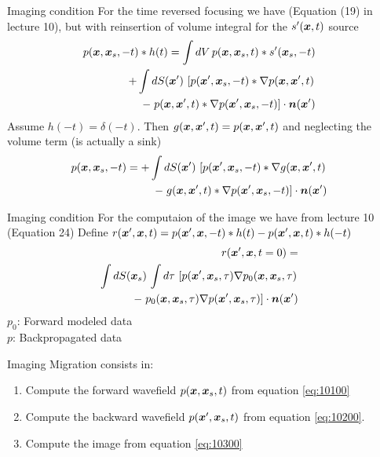 \documentclass[xcolor=dvipsnames,notes]{beamer}
\begin{document}
\begin{frame}{Imaging condition}
For the time reversed focusing we have
(Equation (19) in lecture 10), but with reinsertion of volume integral
for the $s'(\xx,t)$ source
\begin{eqnarray}
 p(\xx,\xx_s,-t)*h(t)=\int dV\, p(\xx,\xx_s,t)*s'(\xx_s,-t) \nonumber\\
+\int dS(\xx')\, \left[p(\xx',\xx_s,-t)*\nabla p(\xx,\xx',t)\right.\nonumber\\
   -\left. p(\xx,\xx',t)*\nabla p(\xx',\xx_s,-t)\right]\cdot \nn(\xx')
&&                   \label{eq:10100}
\end{eqnarray}
Assume $h(-t)=\delta(-t)$. Then $g(\xx,\xx',t) = p(\xx,\xx',t)$
and neglecting the volume term (is actually a sink)
\begin{eqnarray}
 p(\xx,\xx_s,-t)= 
+\int dS(\xx')\, \left[p(\xx',\xx_s,-t)*\nabla g(\xx,\xx',t)\right.\nonumber\\
   -\left. g(\xx,\xx',t)*\nabla p(\xx',\xx_s,-t)\right]\cdot \nn(\xx')
&&                   \label{eq:10200}
\end{eqnarray}
\end{frame}
\begin{frame}{Imaging condition}
For the computaion of the image we have from lecture 10 (Equation 24)
Define $r(\xx',\xx,t) = p(\xx',\xx,-t)*h(t)-p(\xx',\xx,t)*h(-t)$
\begin{eqnarray}
 r(\xx',\xx,t=0)=\nonumber\\
\int dS(\xx_s)\, \int d\tau\, \left[p(\xx',\xx_s,\tau)\nabla p_0(\xx,\xx_s,\tau)\right.\nonumber\\
   -\left. p_0(\xx,\xx_s,\tau)\nabla p(\xx',\xx_s,\tau)\right]\cdot \nn(\xx')
&&                   \label{eq:10300}
\end{eqnarray}
$p_0$: Forward modeled data \\
$p$: Backpropagated data

\end{frame}
\begin{frame}{Imaging}
Migration consists in:
\begin{enumerate}
\item Compute the forward wavefield $p(\xx,\xx_s,t)$ 
      from equation \eqref{eq:10100}
\item Compute the backward wavefield $p(\xx',\xx_s,t)$ from equation \eqref{eq:10200}.
\item Compute the image from equation \eqref{eq:10300}
\end{enumerate}
\end{frame}
\end{document}
